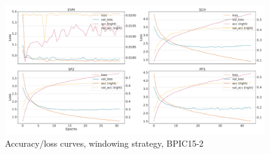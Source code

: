 \begin{figure}[!htb]
    \centering
    \includegraphics[width=\textwidth]{gfx/bpic2015_2/windowed_loss_acc_curve.pdf}
    \caption{Accuracy/loss curves, windowing strategy, BPIC15-2}
\end{figure}
\FloatBarrier


